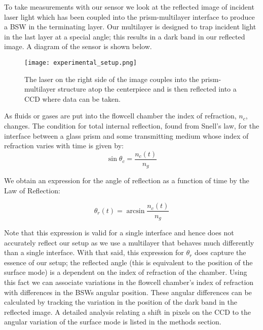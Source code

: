 \begin{flushleft}
	\hspace{0.25in}
	To take measurements with our sensor we look at the reflected image of incident laser light which has been coupled into the prism-multilayer interface to produce a BSW in the terminating layer. Our multilayer is designed to trap incident light in the last layer at a special angle; this results in a dark band in our reflected image. A diagram of the sensor is shown below.
	
	\begin{figure}[h]
	\texttt{[image: experimental\_setup.png]}
	\caption{The laser on the right side of the image couples into the prism-multilayer structure atop the centerpiece and is then reflected into a CCD where data can be taken.}
	\label{fig:SETUP}
	\end{figure}

	\hspace{0.25in}
	As fluids or gases are put into the flowcell chamber the index of refraction, $n_c$, changes. The condition for total internal reflection, found from Snell's law, for the interface between a glass prism and some transmitting medium whose index of refraction varies with time is given by:
	\[
			\sin{\theta_c} = \frac{n_c(t)}{n_g}
	\]

	We obtain an expression for the angle of reflection as a function of time by the Law of Reflection:

	\[
			\theta_r(t) = \arcsin{\frac{n_c(t)}{n_g}}
	\]

	\hspace{0.25in}
	Note that this expression is valid for a single interface and hence does not accurately reflect our setup as we use a multilayer that behaves much differently than a single interface. With that said, this expression for $\theta_r$ does capture the essence of our setup; the reflected angle (this is equivalent to the position of the surface mode) is a dependent on the index of refraction of the chamber. Using this fact we can associate variations in the flowcell chamber's index of refraction with differences in the BSWs angular position. These angular differences can be calculated by tracking the variation in the position of the dark band in the reflected image. A detailed analysis relating a shift in pixels on the CCD to the angular variation of the surface mode is listed in the methods section.

	\pagestyle{empty}
\end{flushleft}
